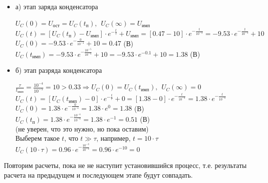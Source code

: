 	\begin{itemize}
\item[] а) этап заряда конденсатора

		$U_C(0) = U_\text{ост} = U_C(t_\text{п}),\ \ U_C(\infty) = U_\text{имп}$\\
		$U_C(t) = [U_C(t_\text{п}) - U_\text{имп}] \cdot e^{-\frac{t}{\tau}} + U_\text{имп} = [0.47 - 10] \cdot e^{-\frac{t}{10^{-4}}} = -9.53 \cdot e^{-\frac{t}{10^{-4}}} + 10$\\
		$U_C(0) = -9.53 \cdot e^{-\frac{0}{10^{-4}}} + 10 = 0.47$ (В)\\
		$U_C(t_\text{имп}) = -9.53 \cdot e^{-\frac{10^{-5}}{10^{-4}}} + 10 = -9.53 \cdot e^{-0.1} + 10 = 1.38$ (В)\\
		
\item[] б) этап разряда конденсатора
	
		$\frac{\tau}{t_\text{имп}} = \frac{10^{-4}}{10^{-5}} = 10 > 0.33 \Rightarrow U_C(0) = U_C(t_\text{имп}),\ \ U_C(\infty) = 0$\\
		$U_C(t) = [U_C(t_\text{имп}) - 0] \cdot e^{-\frac{t}{\tau}} + 0 =  [1.38 - 0] \cdot e^{-\frac{t}{10^{-4}}} = 1.38 \cdot e^{-\frac{t}{10^{-4}}}$\\
		$U_C(0) = 1.38 \cdot e^{-\frac{0}{10^{-4}}} = 1.38 \cdot e^0 = 1.38$ (В)\\
		$U_C(t_\text{п}) = 1.38 \cdot e^{-\frac{10^{-4}}{10^{-4}}} = 1.38 \cdot e^{-1} = 0.51$ (В)\\
		(не уверен, что это нужно, но пока оставим)\\
		Выберем такое $t$, что $t \gg \tau$, например, $t = 10 \cdot \tau$ \\
		$U_C( 10 \cdot \tau) = 0.96 \cdot e^{-\frac{10^{-3}}{10^{-4}}} = 0.96 \cdot e^{-10} = 0$	
		
\end{itemize}	

	Повторим расчеты, пока не не наступит установившийся процесс, т.е. результаты расчета на предыдущем и последующем этапе будут совпадать.		
	
